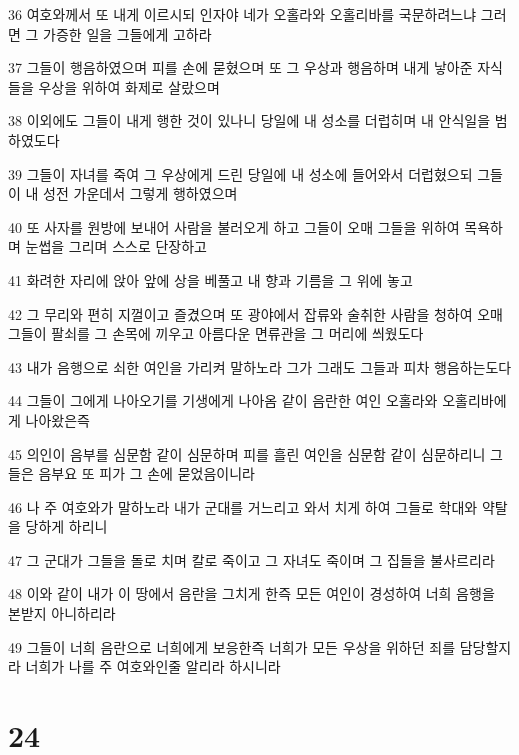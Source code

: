 \par 36 여호와께서 또 내게 이르시되 인자야 네가 오홀라와 오홀리바를 국문하려느냐 그러면 그 가증한 일을 그들에게 고하라
\par 37 그들이 행음하였으며 피를 손에 묻혔으며 또 그 우상과 행음하며 내게 낳아준 자식들을 우상을 위하여 화제로 살랐으며
\par 38 이외에도 그들이 내게 행한 것이 있나니 당일에 내 성소를 더럽히며 내 안식일을 범하였도다
\par 39 그들이 자녀를 죽여 그 우상에게 드린 당일에 내 성소에 들어와서 더럽혔으되 그들이 내 성전 가운데서 그렇게 행하였으며
\par 40 또 사자를 원방에 보내어 사람을 불러오게 하고 그들이 오매 그들을 위하여 목욕하며 눈썹을 그리며 스스로 단장하고
\par 41 화려한 자리에 앉아 앞에 상을 베풀고 내 향과 기름을 그 위에 놓고
\par 42 그 무리와 편히 지껄이고 즐겼으며 또 광야에서 잡류와 술취한 사람을 청하여 오매 그들이 팔쇠를 그 손목에 끼우고 아름다운 면류관을 그 머리에 씌웠도다
\par 43 내가 음행으로 쇠한 여인을 가리켜 말하노라 그가 그래도 그들과 피차 행음하는도다
\par 44 그들이 그에게 나아오기를 기생에게 나아옴 같이 음란한 여인 오홀라와 오홀리바에게 나아왔은즉
\par 45 의인이 음부를 심문함 같이 심문하며 피를 흘린 여인을 심문함 같이 심문하리니 그들은 음부요 또 피가 그 손에 묻었음이니라
\par 46 나 주 여호와가 말하노라 내가 군대를 거느리고 와서 치게 하여 그들로 학대와 약탈을 당하게 하리니
\par 47 그 군대가 그들을 돌로 치며 칼로 죽이고 그 자녀도 죽이며 그 집들을 불사르리라
\par 48 이와 같이 내가 이 땅에서 음란을 그치게 한즉 모든 여인이 경성하여 너희 음행을 본받지 아니하리라
\par 49 그들이 너희 음란으로 너희에게 보응한즉 너희가 모든 우상을 위하던 죄를 담당할지라 너희가 나를 주 여호와인줄 알리라 하시니라

\chapter{24}

